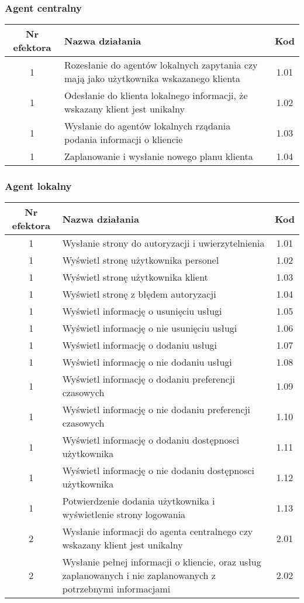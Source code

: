 \subsubsection{Agent centralny}

\begin{tabular}{c|p{5cm}|c}
Nr efektora & Nazwa działania & Kod\\
\hline
1 & Rozesłanie do agentów lokalnych zapytania czy mają jako użytkownika wskazanego klienta & 1.01\\
1 & Odesłanie do klienta lokalnego informacji, że wskazany klient jest unikalny & 1.02\\
1 & Wysłanie do agentów lokalnych rządania podania informacji o kliencie & 1.03\\
1 & Zaplanowanie i wysłanie nowego planu klienta & 1.04\\
\end{tabular}

\subsubsection{Agent lokalny}

\begin{tabular}{c|p{5cm}|c}
Nr efektora & Nazwa działania & Kod\\
\hline
1 & Wysłanie strony do autoryzacji i uwierzytelnienia & 1.01\\
1 & Wyświetl stronę użytkownika personel & 1.02\\
1 & Wyświetl stronę użytkownika klient & 1.03\\
1 & Wyświetl stronę z błędem autoryzacji & 1.04\\
1 & Wyświetl informację o usunięciu usługi & 1.05\\
1 & Wyświetl informację o nie usunięciu usługi & 1.06\\
1 & Wyświetl informację o dodaniu usługi & 1.07\\
1 & Wyświetl informację o nie dodaniu usługi & 1.08\\
1 & Wyświetl informację o dodaniu preferencji czasowych & 1.09\\
1 & Wyświetl informację o nie dodaniu preferencji czasowych & 1.10\\
1 & Wyświetl informację o dodaniu dostępnosci użytkownika & 1.11\\
1 & Wyświetl informację o nie dodaniu dostępnosci użytkownika & 1.12\\
1 & Potwierdzenie dodania użytkownika i wyświetlenie strony logowania & 1.13\\
\hline
2 & Wysłanie informacji do agenta centralnego czy wskazany klient jest unikalny & 2.01\\
2 & Wysłanie pełnej informacji o kliencie, oraz usług zaplanowanych i nie zaplanowanych z potrzebnymi informacjami & 2.02\\
\end{tabular}

